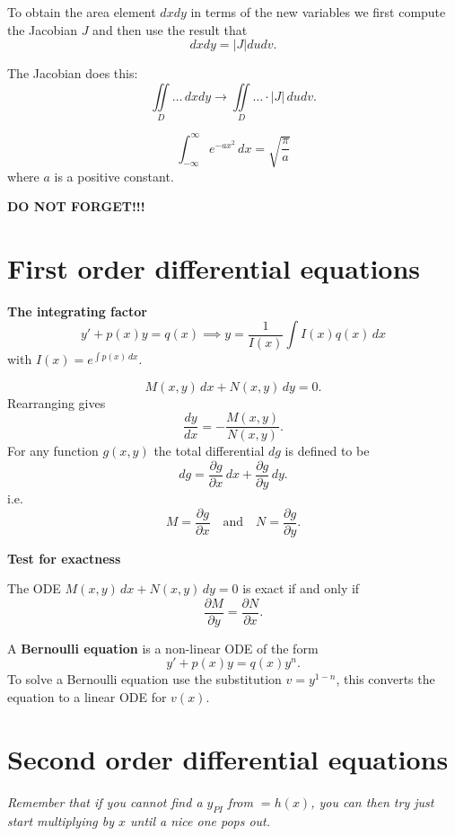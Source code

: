 \documentclass[10pt, a4paper]{article}
\begin{document}
To obtain the area element $dxdy$ in terms of the new variables we first compute the Jacobian $J$ and then use the result that
\[
dxdy = |J|dudv.
\]

The Jacobian does this:
\[
\iint\limits_{D}\dotsc\,dxdy \to \iint\limits_{D}\dotsc\cdot|J|\,dudv.
\]

\begin{definition}
    \[
    \int_{-\infty}^{\infty}e ^ {-ax ^ 2}\,dx = \sqrt{\frac{\pi}{a}}
    \]
    where $a$ is a positive constant.
\end{definition}

\textbf{DO NOT FORGET!!!}
\begin{center}
\end{center}
\hfill

\newpage

\section{First order differential equations}
\textbf{The integrating factor}
\[
y' + p(x)y = q(x) \implies y = \frac{1}{I(x)}\int I(x)q(x)\,dx
\]
with $I(x) = e ^ {\int p(x)\,dx}$.

\[
M(x, y)\,dx + N(x, y)\,dy = 0.
\]
Rearranging gives
\[
\frac{dy}{dx} = -\frac{M(x, y)}{N(x, y)}.
\]
For any function $g(x, y)$ the total differential $dg$ is defined to be
\[
dg = \frac{\partial g}{\partial x}\,dx + \frac{\partial g}{\partial y}\,dy.
\]
i.e.
\[
M = \frac{\partial g}{\partial x}\quad\text{and}\quad N = \frac{\partial g}{\partial y}.
\]

\textbf{Test for exactness}

The ODE $M(x, y)\,dx + N(x, y)\,dy = 0$ is exact if and only if
\[
\frac{\partial M}{\partial y} = \frac{\partial N}{\partial x}.
\]

A \textbf{Bernoulli equation} is a non-linear ODE of the form
\[
y' + p(x)y = q(x)y ^ n.
\]
To solve a Bernoulli equation use the substitution $v = y ^ {1 - n}$,
this converts the equation to a linear ODE for $v(x)$.

\newpage

\section{Second order differential equations}
\textit{Remember that if you cannot find a $y_{PI}$ from $= h(x)$,
you can then try just start multiplying by $x$ until a nice one pops out.}
\end{document}

